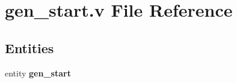 \section{gen\-\_\-start.\-v File Reference}
\label{gen__start_8v}
\subsection*{Entities}
\begin{DoxyCompactItemize}
\item 
entity {\bf gen\-\_\-start}
\end{DoxyCompactItemize}
